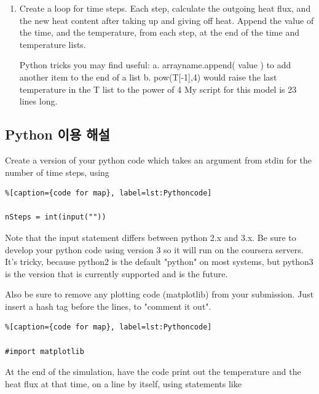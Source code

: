 {\begin{enumerate}
to create a plot of the temperature versus time. Create an array for time_list, initially [ 0 ] (a ‘list’ or array with one value in it, the number 0), and similarly for temperature_list. Set the initial temperature (maybe to 0 K, or whatever you like), and calculate the initial heat content (units of J/m2).

	\item Create a loop for time steps. Each step, calculate the outgoing heat flux, and the new heat content after taking up and giving off heat. Append the value of the time, and the temperature, from each step, at the end of the time and temperature lists.
	
Python tricks you may find useful:
a. arrayname.append( value ) to add another item to the end of a list
b. pow(T[-1],4) would raise the last temperature in the T list to the power of 4
My script for this model is 23 lines long.


\end{enumerate}


\subsection{Python 이용 해설}\index{}

Create a version of your python code which takes an argument from stdin for the number of time steps, using

\begin{lstlisting}%[caption={code for map}, label=lst:Pythoncode]

nSteps = int(input(""))
\end{lstlisting}

Note that the input statement differs between python 2.x and 3.x. Be sure to develop your python code using version 3 so it will run on the coursera servers. It's tricky, because python2 is the default "python" on most systems, but python3 is the version that is currently supported and is the future.

Also be sure to remove any plotting code (matplotlib) from your submission. Just insert a hash tag before the lines, to "comment it out".

\begin{lstlisting}%[caption={code for map}, label=lst:Pythoncode]

#import matplotlib
\end{lstlisting}


At the end of the simulation, have the code print out the temperature and the heat flux at that time, on a line by itself, using statements like

}
